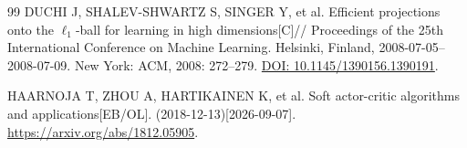 \begin{thebibliography}{99}
DUCHI J, SHALEV-SHWARTZ S, SINGER Y, et al.
Efficient projections onto the $\ell_1$-ball for learning in high dimensions[C]//
Proceedings of the 25th International Conference on Machine Learning.
Helsinki, Finland, 2008-07-05--2008-07-09.
New York: ACM, 2008: 272--279.
\href{https://doi.org/10.1145/1390156.1390191}{DOI: 10.1145/1390156.1390191}.

HAARNOJA T, ZHOU A, HARTIKAINEN K, et al.
Soft actor-critic algorithms and applications[EB/OL].
(2018-12-13)[2026-09-07].
\url{https://arxiv.org/abs/1812.05905}.
\end{thebibliography}
